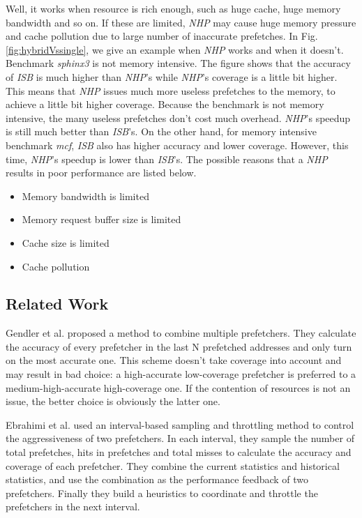   Well, it works when resource is rich enough, such as huge cache, huge memory bandwidth and so on. If these are limited, \emph{NHP} may cause huge memory pressure and cache pollution due to large number of inaccurate prefetches. In Fig. \ref{fig:hybridVssingle}, we give an example when \emph{NHP} works and when it doesn't.
 Benchmark \emph{sphinx3} is not memory intensive. The figure shows that the accuracy of \emph{ISB} is much higher than \emph{NHP}'s while \emph{NHP}'s coverage is a little bit higher. This means that \emph{NHP} issues much more useless prefetches to the memory, to achieve a little bit higher coverage. Because the benchmark is not memory intensive, the many useless prefetches don't cost much overhead. \emph{NHP}'s speedup is still much better than \emph{ISB}'s.
 On the other hand, for memory intensive benchmark \emph{mcf}, \emph{ISB} also has higher accuracy and lower coverage. However, this time, \emph{NHP}'s speedup is lower than \emph{ISB}'s. The possible reasons that a \emph{NHP} results in poor performance are listed below.


  \begin{itemize}
    \item Memory bandwidth is limited
    \item Memory request buffer size is limited
    \item Cache size is limited
    \item Cache pollution
  \end{itemize}

  \subsection{Related Work}
  \label{sec:PrevSol}
  Gendler et al.\cite{gendlerpaper} proposed a method to combine multiple prefetchers.
  They calculate the accuracy of every prefetcher in the last N prefetched addresses and only turn on the most accurate one.
  This scheme doesn't take coverage into account and may result in bad choice: a high-accurate low-coverage prefetcher is preferred to a medium-high-accurate high-coverage one.
  If the contention of resources is not an issue, the better choice is obviously the latter one. \par
  Ebrahimi et al.\cite{yalepaper} used an interval-based sampling and throttling method to control the aggressiveness of two prefetchers.
  In each interval, they sample the number of total prefetches, hits in prefetches and total misses to calculate the accuracy and coverage of each prefetcher.
  They combine the current statistics and historical statistics, and use the combination as the performance feedback of two prefetchers.
  Finally they build a heuristics to coordinate and throttle the prefetchers in the next interval.


